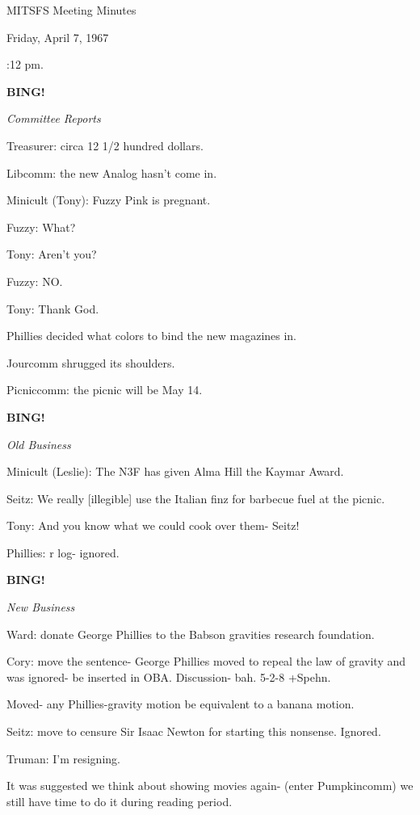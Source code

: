 \documentclass[12pt]{article}
\newcommand{\bing}{{\bf BING!} }
\newcommand{\goto}[1]{\bing \vskip 12pt \centerline{{\em{#1}}}}
\begin{document}
\begin{center}

MITSFS Meeting Minutes

Friday, April 7, 1967

\end{center}
 
\vspace{12pt}

\setlength{\parskip}{6pt}

:12 pm.

\goto{Committee Reports}

Treasurer: circa 12 1/2 hundred dollars.

Libcomm: the new Analog hasn't come in.

Minicult (Tony): Fuzzy Pink is pregnant.

Fuzzy: What?

Tony: Aren't you?

Fuzzy: NO.

Tony: Thank God.

Phillies decided what colors to bind the new magazines in.

Jourcomm shrugged its shoulders.

Picniccomm: the picnic will be May 14.

\goto{Old Business}

Minicult (Leslie): The N3F has given Alma Hill the Kaymar Award.

Seitz: We really [illegible] use the Italian finz for barbecue fuel at the picnic.

Tony: And you know what we could cook over them- Seitz!

Phillies: r log- ignored.

\goto{New Business}

Ward: donate George Phillies to the Babson gravities research foundation.

Cory: move the sentence- George Phillies moved to repeal the law of gravity and was ignored- be inserted in OBA. Discussion- bah. 5-2-8 +Spehn.

Moved- any Phillies-gravity motion be equivalent to a banana motion.

Seitz: move to censure Sir Isaac Newton for starting this nonsense. Ignored.

Truman: I'm resigning.

It was suggested we think about showing movies again- (enter Pumpkincomm) we still have time to do it during reading period.
\end{document}
